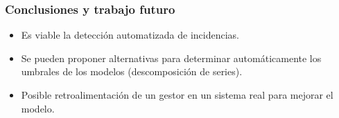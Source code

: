 \documentclass{beamer}
\begin{document}
\begin{frame}

\frametitle{Conclusiones y trabajo futuro}
\begin{itemize}
\item Es viable la detección automatizada de incidencias.
\item Se pueden proponer alternativas para determinar automáticamente los umbrales de los modelos (descomposición de series).
\item Posible retroalimentación de un gestor en un sistema real para mejorar el modelo.
\end{itemize}

\end{frame}
\end{document}
